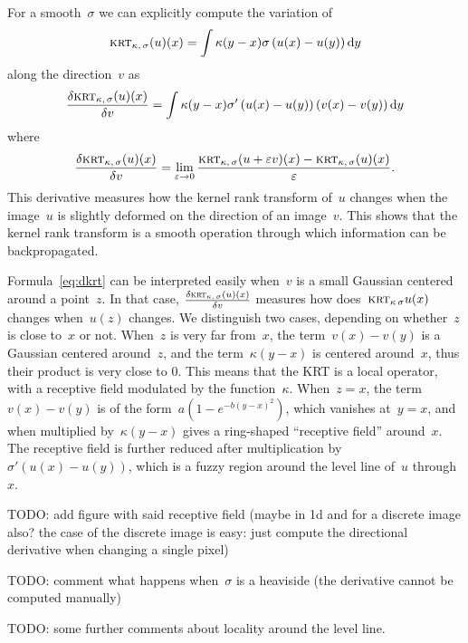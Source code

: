 \documentclass[12pt]{article}                  %
\def\parens#1{\left(#1\right)}
\begin{document}
For a smooth~$\sigma$ we can explicitly compute the variation of
\begin{equation}
	\textsc{krt}_{\kappa,\,\sigma}(u)(x) = \int\kappa(y-x)\sigma\parens{u(x)-u(y)}\mathrm{d}y
\end{equation}
along the direction~$v$ as
\begin{equation}\label{eq:dkrt}
	\frac{\delta \textsc{krt}_{\kappa,\,\sigma}(u)(x)}{\delta v}
	= \int\kappa(y-x)\sigma'\parens{u(x)-u(y)}\parens{v(x)-v(y)}\mathrm{d}y
\end{equation}
where
\begin{equation}
	\frac{\delta \textsc{krt}_{\kappa,\,\sigma}(u)(x)}{\delta v}
	=
	\lim_{\varepsilon\to0}
	\frac{\textsc{krt}_{\kappa,\,\sigma}(u+\varepsilon v)(x)
	-\textsc{krt}_{\kappa,\,\sigma}(u)(x)}{\varepsilon}.
\end{equation}
This derivative measures how the kernel rank transform of~$u$ changes
when the image~$u$ is slightly deformed on the direction of an image~$v$.
This shows that the kernel rank transform is a smooth operation through
which information can be backpropagated.

Formula~\ref{eq:dkrt} can be interpreted easily when~$v$ is a small Gaussian
centered around a point~$z$.  In that case, $\frac{\delta
\textsc{krt}_{\kappa,\,\sigma}(u)(x)}{\delta v}$ measures how
does~$\textsc{krt}_{\kappa\,\sigma}u(x)$ changes when~$u(z)$ changes.
We distinguish two cases, depending on whether~$z$ is close to~$x$ or not.
When~$z$ is very far from~$x$, the term~$v(x)-v(y)$ is a Gaussian centered
around~$z$, and the term~$\kappa(y-x)$ is centered around~$x$, thus their
product is very close to 0.  This means that the KRT is a local operator,
with a receptive field modulated by the function~$\kappa$.  When~$z=x$, the
term~$v(x)-v(y)$ is of the form~$a(1-e^{-b(y-x)^2})$, which vanishes
at~$y=x$, and when multiplied by~$\kappa(y-x)$ gives a ring-shaped ``receptive
field'' around~$x$.  The receptive field is further reduced after
multiplication by~$\sigma'\parens{u(x)-u(y)}$, which is a fuzzy region
around the level line of~$u$ through~$x$.

TODO: add figure with said receptive field (maybe in 1d and for a discrete
image also? the case of the discrete image is easy: just compute the
directional derivative when changing a single pixel)

TODO: comment what happens when~$\sigma$ is a heaviside (the derivative
cannot be computed manually)

TODO: some further comments about locality around the level line.
\end{document}
